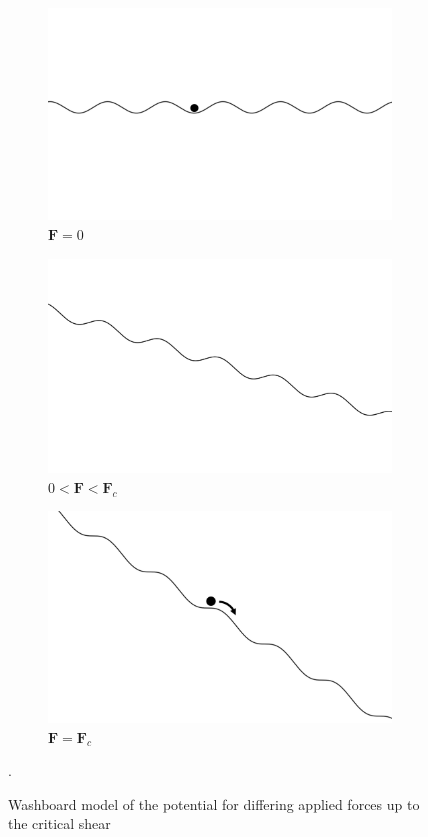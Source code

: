 \documentclass{article}
\numberwithin{equation}{section}
\begin{document}
\begin{figure}[htb]
\centering
\begin{subfigure}[t]{.33\textwidth}
  \centering
  \includegraphics[width=.9\linewidth]{results/Figures/washboard-f0.png}
  \caption{$\mathbf{F}=0$}
  \label{fig:washboard_f0}
\end{subfigure}
\hfill
\begin{subfigure}[t]{.33\textwidth}
  \centering
  \includegraphics[width=.9\linewidth]{results/Figures/washboard-f.png}
  \caption{$0<\mathbf{F}<\mathbf{F}_c$}
  \label{fig:washboard_f}
\end{subfigure}
\hfill
\begin{subfigure}[t]{.33\textwidth}
  \centering
  \includegraphics[width=.9\linewidth]{results/Figures/washboard-fc.png}
  \caption{$\mathbf{F}=\mathbf{F}_c$}
  \label{fig:washboard_fc}
\end{subfigure}
\caption{Washboard model of the potential for differing applied forces up to the critical shear  }.
\label{fig:washboard}
\end{figure}
\end{document}
